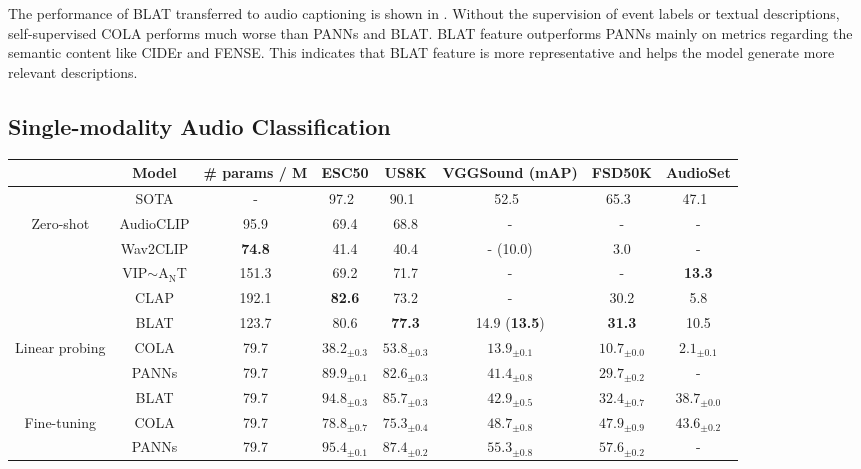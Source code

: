 \documentclass[sigconf]{acmart}
\begin{document}
The performance of BLAT transferred to audio captioning is shown in .
Without the supervision of event labels or textual descriptions, self-supervised COLA performs much worse than PANNs and BLAT.
BLAT feature outperforms PANNs mainly on metrics regarding the semantic content like CIDEr and FENSE.
This indicates that BLAT feature is more representative and helps the model generate more relevant descriptions.

\subsection{Single-modality Audio Classification}

\begin{table}[ht]
    \centering
    \begin{tabular}{cc|c||ccccc}
    \toprule
     & Model & \# params / M & ESC50 & US8K & VGGSound (mAP) & FSD50K & AudioSet\\
    \midrule
     & SOTA & - & 97.2~\cite{guzhov2022audioclip} & 90.1~\cite{guzhov2022audioclip} & 52.5~\cite{kazakos2021slow} & 65.3~\cite{koutini2021efficient} & 47.1~\cite{koutini2021efficient}\\
    \midrule
    \multirow{5}{*}{Zero-shot} & AudioCLIP & 95.9 & 69.4 & 68.8 & - & - & -\\
     & Wav2CLIP & \textbf{74.8} & 41.4 & 40.4 & - (10.0) & 3.0 & - \\
     & VIP$\sim$A$_\text{N}$T & 151.3 & 69.2 & 71.7 & - & - & \textbf{13.3}\\
     & CLAP & 192.1 & \textbf{82.6} & 73.2 & - & 30.2 & 5.8 \\
     & BLAT & 123.7 & 80.6 & \textbf{77.3} & 14.9 (\textbf{13.5}) & \textbf{31.3} & 10.5\\
    \midrule
    \multirow{3}{*}{Linear probing} & COLA & 79.7 & $38.2_{\pm 0.3}$ & $53.8_{\pm 0.3}$ & $13.9_{\pm 0.1}$ & $10.7_{\pm 0.0}$ & $2.1_{\pm 0.1}$ \\
    & PANNs & 79.7& $89.9_{\pm 0.1}$ & $82.6_{\pm 0.3}$ & $41.4_{\pm 0.8}$ & $29.7_{\pm 0.2}$ & - \\
     & BLAT & 79.7& $\mathbf{94.8_{\pm 0.3}}$ & $\mathbf{85.7_{\pm 0.3}}$ & $\mathbf{42.9_{\pm 0.5}}$ & $\mathbf{32.4_{\pm 0.7}}$ & $\mathbf{38.7_{\pm 0.0}}$\\
    \midrule
    \multirow{3}{*}{Fine-tuning} & COLA & 79.7& $78.8_{\pm 0.7}$ & $75.3_{\pm 0.4}$ & $48.7_{\pm 0.8}$ & $47.9_{\pm 0.9}$ & $43.6_{\pm 0.2}$ \\
    & PANNs & 79.7& $95.4_{\pm 0.1}$ & $87.4_{\pm 0.2}$ & $\mathbf{55.3_{\pm 0.8}}$ & $57.6_{\pm 0.2}$ & - \\

\end{tabular}
\end{table}
\end{document}
